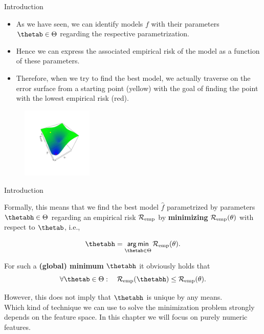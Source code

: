 \documentclass[11pt,compress,t,notes=noshow, xcolor=table]{beamer}
\begin{document}
\begin{vbframe}{Introduction}
\begin{itemize}
\item As we have seen, we can identify models $f$ with their parameters $\thetab \in \Theta$ regarding the respective parametrization. 
\item Hence we can express the associated empirical risk of the model as a function of these parameters.
\item Therefore, when we try to find the best model, we actually traverse on the error surface from a starting point (yellow) with the goal of finding the point with the lowest empirical risk (red).
\end{itemize}
\begin{center}
\begin{figure}[!b]
\includegraphics[trim=2.4cm 2.4cm 2.4cm 2.4cm, width=0.3\textwidth]{figure/err_surf}
\end{figure}
\end{center}

\end{vbframe}
\begin{vbframe}{Introduction}

Formally, this means that we find the best model $\hat f$ parametrized by parameters $\thetabh \in \Theta$ regarding an empirical risk $\mathcal{R}_{\text{emp}}$ by \textbf{minimizing} $\mathcal{R}_{\text{emp}}(\theta)$ with respect to $\thetab$, i.e., 

\[
\thetabh  = \argmin_{\thetab \in \Theta} \risket .
\]

For such a \textbf{(global) minimum} $\thetabh$ it obviously holds that 
\[
\forall \thetab \in \Theta :\quad \riske(\thetabh) \leq \risket .
\]

However, this does not imply that $\thetabh$ is unique by any means. \\
\lz
Which kind of technique we can use to solve the minimization problem strongly depends on the feature space. In this chapter we will focus on purely numeric features.

\end{vbframe}
\end{document}
